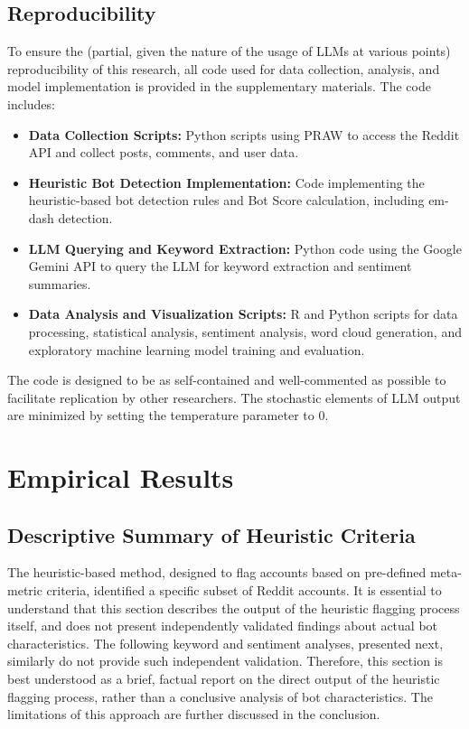 \documentclass[
  12pt,
  letterpaper,
  DIV=11,
  numbers=noendperiod,
  abstract]{scrartcl}
\providecommand{\tightlist}{%
  \setlength{\itemsep}{0pt}\setlength{\parskip}{0pt}}\usepackage{longtable,booktabs,array}
\begin{document}
\subsection{Reproducibility}\label{reproducibility}

To ensure the (partial, given the nature of the usage of LLMs at various
points) reproducibility of this research, all code used for data
collection, analysis, and model implementation is provided in the
supplementary materials. The code includes:

\begin{itemize}
\tightlist
\item
  \textbf{Data Collection Scripts:} Python scripts using PRAW to access
  the Reddit API and collect posts, comments, and user data.
\item
  \textbf{Heuristic Bot Detection Implementation:} Code implementing the
  heuristic-based bot detection rules and Bot Score calculation,
  including em-dash detection.
\item
  \textbf{LLM Querying and Keyword Extraction:} Python code using the
  Google Gemini API to query the LLM for keyword extraction and
  sentiment summaries.
\item
  \textbf{Data Analysis and Visualization Scripts:} R and Python scripts
  for data processing, statistical analysis, sentiment analysis, word
  cloud generation, and exploratory machine learning model training and
  evaluation.
\end{itemize}

The code is designed to be as self-contained and well-commented as
possible to facilitate replication by other researchers. The stochastic
elements of LLM output are minimized by setting the temperature
parameter to 0.

\section{Empirical Results}\label{empirical-results}

\subsection{Descriptive Summary of Heuristic
Criteria}\label{descriptive-summary-of-heuristic-criteria}

The heuristic-based method, designed to flag accounts based on
pre-defined meta-metric criteria, identified a specific subset of Reddit
accounts. It is essential to understand that this section describes the
output of the heuristic flagging process itself, and does not present
independently validated findings about actual bot characteristics. The
following keyword and sentiment analyses, presented next, similarly do
not provide such independent validation. Therefore, this section is best
understood as a brief, factual report on the direct output of the
heuristic flagging process, rather than a conclusive analysis of bot
characteristics. The limitations of this approach are further discussed
in the conclusion.
\end{document}
